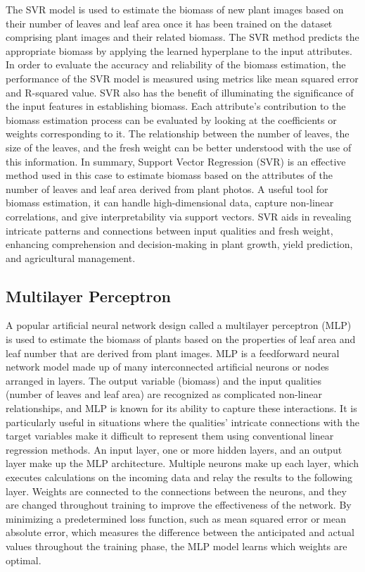 \documentclass[a4paper,11pt]{report}%
\renewcommand{\\}{\vspace*{0.5\baselineskip} \newline}
\begin{document}
\noindent The SVR model is used to estimate the biomass of new plant images based on their number of leaves and leaf area once it has been trained on the dataset comprising plant images and their related biomass. The SVR method predicts the appropriate biomass by applying the learned hyperplane to the input attributes.
In order to evaluate the accuracy and reliability of the biomass estimation, the performance of the SVR model is measured using metrics like mean squared error and R-squared value.
SVR also has the benefit of illuminating the significance of the input features in establishing biomass. Each attribute's contribution to the biomass estimation process can be evaluated by looking at the coefficients or weights corresponding to it. The relationship between the number of leaves, the size of the leaves, and the fresh weight can be better understood with the use of this information.
In summary, Support Vector Regression (SVR) is an effective method used in this case to estimate biomass based on the attributes of the number of leaves and leaf area derived from plant photos. A useful tool for biomass estimation, it can handle high-dimensional data, capture non-linear correlations, and give interpretability via support vectors. SVR aids in revealing intricate patterns and connections between input qualities and fresh weight, enhancing comprehension and decision-making in plant growth, yield prediction, and agricultural management.

\subsection{ Multilayer Perceptron}
A popular artificial neural network design called a multilayer perceptron (MLP) is used to estimate the biomass of plants based on the properties of leaf area and leaf number that are derived from plant images. MLP is a feedforward neural network model made up of many interconnected artificial neurons or nodes arranged in layers.
The output variable (biomass) and the input qualities (number of leaves and leaf area) are recognized as complicated non-linear relationships, and MLP is known for its ability to capture these interactions. It is particularly useful in situations where the qualities' intricate connections with the target variables make it difficult to represent them using conventional linear regression methods.
An input layer, one or more hidden layers, and an output layer make up the MLP architecture. Multiple neurons make up each layer, which executes calculations on the incoming data and relay the results to the following layer. Weights are connected to the connections between the neurons, and they are changed throughout training to improve the effectiveness of the network.
By minimizing a predetermined loss function, such as mean squared error or mean absolute error, which measures the difference between the anticipated and actual values throughout the training phase, the MLP model learns which weights are optimal. 
\end{document}
